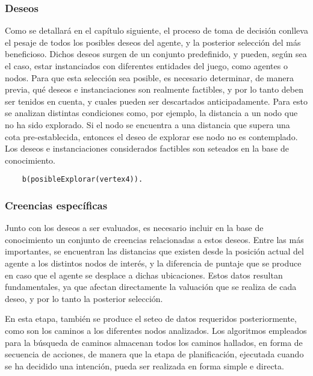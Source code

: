 \documentclass[oneside]{book}
\begin{document}
\subsubsection{Deseos}

Como se detallará en el capítulo siguiente, el proceso de toma de decisión conlleva el 
pesaje de todos los posibles deseos del agente, y la posterior selección del más beneficioso. 
Dichos deseos surgen de un conjunto predefinido, y pueden, según sea el caso, estar 
instanciados con diferentes entidades del juego, como agentes o nodos. Para que esta 
selección sea posible, es necesario determinar, de manera previa, qué deseos e instanciaciones 
son realmente factibles, y por lo tanto deben ser tenidos en cuenta, y cuales pueden ser 
descartados anticipadamente.
Para esto se analizan distintas condiciones como, por ejemplo, la distancia a un nodo 
que no ha sido explorado. Si el nodo se encuentra a una distancia que supera una cota 
pre-establecida, entonces el deseo de explorar ese nodo no es contemplado.
Los deseos e instanciaciones considerados factibles son seteados en la base de conocimiento.

\begin{verbatim}
    b(posibleExplorar(vertex4)).
\end{verbatim}

\subsubsection{Creencias específicas} %

Junto con los deseos a ser evaluados, es necesario incluir en la base de conocimiento 
un conjunto de creencias relacionadas a estos deseos. Entre las más importantes, se 
encuentran las distancias que existen desde la posición actual del agente a los distintos 
nodos de interés, y la diferencia de puntaje que se produce en caso que el agente se desplace 
a dichas ubicaciones. Estos datos resultan fundamentales, ya que afectan directamente la 
valuación que se realiza de cada deseo, y por lo tanto la posterior selección.

En esta etapa, también se produce el seteo de datos requeridos posteriormente, como son 
los caminos a los diferentes nodos analizados. Los algoritmos empleados para la búsqueda 
de caminos almacenan todos los caminos hallados, en forma de secuencia de acciones, de 
manera que la etapa de planificación, ejecutada cuando se ha decidido una intención, 
pueda ser realizada en forma simple e directa.
\end{document}
